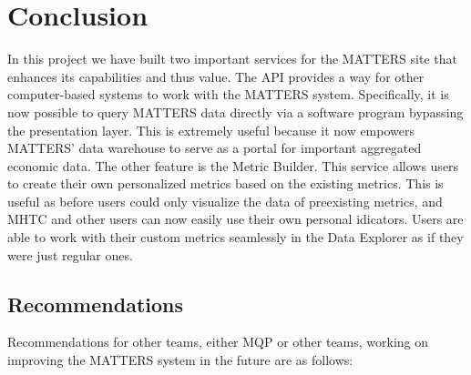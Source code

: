 \chapter{Conclusion}

	In this project we have built two important services for the MATTERS site that enhances its capabilities and thus value. The API 
	provides a way for other computer-based systems to work with the MATTERS 
	system. Specifically, it is now possible to query MATTERS data directly via a software program 
	bypassing the presentation layer. This is extremely useful because it now empowers MATTERS' data warehouse to serve as a portal for important aggregated economic data.
	The other feature is the Metric Builder. 
	This service allows users to create their own personalized metrics based on 
	the existing metrics. This is useful as before users could only visualize the data of preexisting metrics, and MHTC and other users can now easily use their own personal idicators. 
	Users are able to work with their custom metrics seamlessly 
	in the Data Explorer as if they were just regular ones.  

	\section{Recommendations}
		
		Recommendations for other teams, either MQP or other teams, working on improving the MATTERS system in the future are as follows:
		

